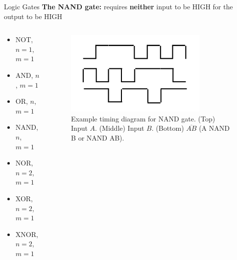 \documentclass{beamer}
\begin{document}
\begin{frame}{Logic Gates}
\textbf{The NAND gate:} requires \textbf{neither} input to be HIGH for the output to be HIGH \\ \vspace{0.5cm}
\begin{columns}[T]
\begin{column}{0.5\textwidth}
\begin{itemize}
\item \alert{NOT, $n=1$, $m=1$}
\item \alert{AND, $n$, $m=1$}
\item \alert{OR, $n$, $m=1$}
\item \alert{NAND, $n$, $m=1$}
\item NOR, $n=2$, $m=1$
\item XOR, $n=2$, $m=1$
\item XNOR, $n=2$, $m=1$
\end{itemize}
\end{column}
\begin{column}{0.5\textwidth}
\begin{figure}
\centering
\includegraphics[width=0.8\textwidth]{figures/TimingNand.pdf}
\caption{\label{fig:nand2} Example timing diagram for NAND gate.  (Top) Input $A$.  (Middle) Input $B$. (Bottom) $\overline{AB}$ (A NAND B or NAND AB).}
\end{figure}
\end{column}
\end{columns}
\end{frame}
\end{document}
